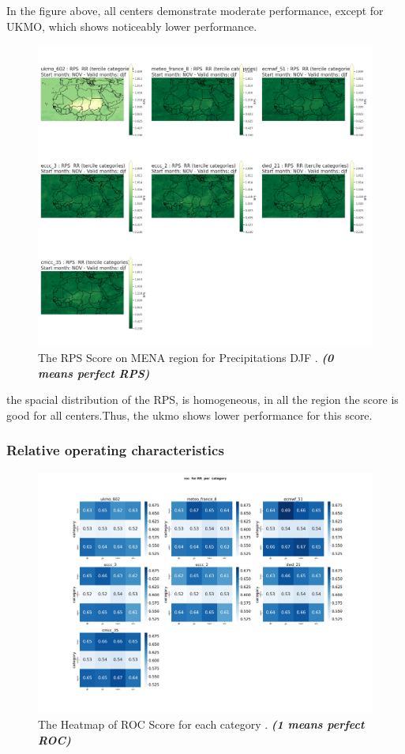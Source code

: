 In the figure above, all centers demonstrate moderate performance, except for UKMO, which shows noticeably lower performance. 


\begin{figure}[H]
    \centering
    \includegraphics[scale=0.25]{plots/prob/rps/rps_djf_RR.png}
    \caption{The   RPS Score on MENA region for Precipitations DJF   . \textbf{\textit{(0 means perfect RPS)}}}
\end{figure}

the spacial distribution of the RPS, is homogeneous, in all the region the score is good for all centers.Thus, the ukmo shows lower performance for this score.




\subsubsection{Relative operating characteristics}

\begin{figure}[H]
    \centering
    \includegraphics[scale=0.25]{plots/prob/roc/roc_RR_category.png}
    \caption{The Heatmap of ROC Score for each category  . \textbf{\textit{(1 means perfect ROC)}}}
\end{figure}

